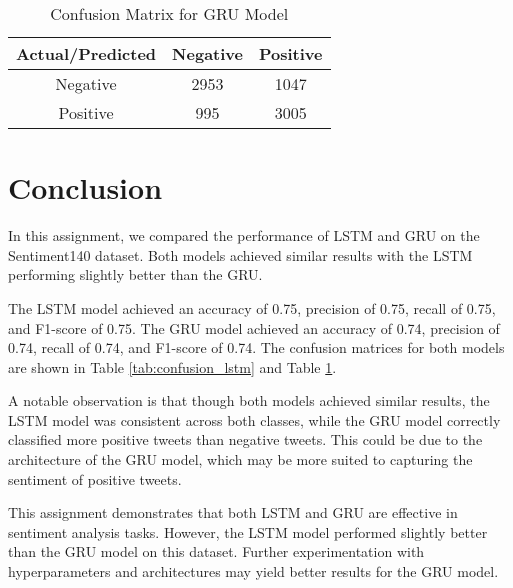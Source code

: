 \documentclass{article}
\begin{document}
\begin{table}[!htb]
    \centering
    \begin{tabular}{|c|c|c|}
        \hline
        \textbf{Actual/Predicted} & \textbf{Negative} & \textbf{Positive} \\
        \hline
        Negative                  & 2953              & 1047              \\
        Positive                  & 995               & 3005              \\
        \hline
    \end{tabular}
    \caption{Confusion Matrix for GRU Model}
    \label{tab:confusion_gru}
\end{table}


\section{Conclusion}
In this assignment, we compared the performance of LSTM and GRU on the Sentiment140 dataset. Both models achieved similar results with the LSTM performing slightly better than the GRU.

The LSTM model achieved an accuracy of 0.75, precision of 0.75, recall of 0.75, and F1-score of 0.75. The GRU model achieved an accuracy of 0.74, precision of 0.74, recall of 0.74, and F1-score of 0.74. The confusion matrices for both models are shown in Table \ref{tab:confusion_lstm} and Table \ref{tab:confusion_gru}.

A notable observation is that though both models achieved similar results, the LSTM model was consistent across both classes, while the GRU model correctly classified more positive tweets than negative tweets. This could be due to the architecture of the GRU model, which may be more suited to capturing the sentiment of positive tweets.

This assignment demonstrates that both LSTM and GRU are effective in sentiment analysis tasks. However, the LSTM model performed slightly better than the GRU model on this dataset. Further experimentation with hyperparameters and architectures may yield better results for the GRU model.
\end{document}
